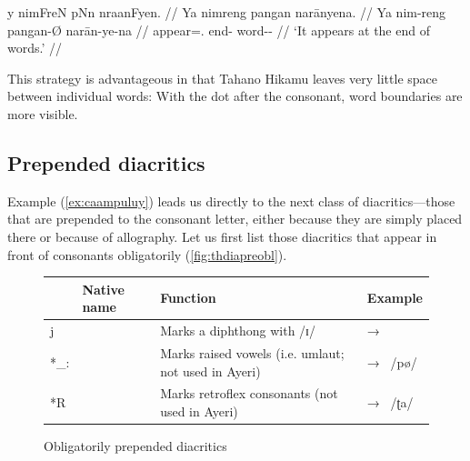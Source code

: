 \ex[everygla=\Tagati\Large,everyglb=\itshape]\begingl
	\gla y nimFreN\thafterdot{} pNn\thafterdot{} 
		nraanFyen. //
	\glb Ya nimreng pangan narānyena. //
	\glc Ya nim-reng pangan-Ø narān-ye-na //
	\glc \LocT{} appear=\TsgI{}.\Aarg{} end-\Top{} word-\Pl{}-\Gen{} //
	\glft `It appears at the end of words.' //
\endgl\xe

This strategy is advantageous in that Tahano Hikamu leaves very little space 
between individual words:  With the dot after the consonant, word boundaries are more visible.

\subsection{Prepended diacritics}

Example (\ref{ex:caampuluy}) leads us directly to the next class of 
diacritics---those that are prepended to the consonant letter, either because 
they are simply placed there or because of allography. Let us first list those 
diacritics that appear in front of consonants obligatorily 
(\autoref{fig:thdiapreobl}).

\begin{figure}[tp]
\caption{Obligatorily prepended diacritics}
\begin{tabu} to 
\toprule
\tableheaderfont

	& Native name
	& Function
	& Example
	\\
	
\toprule

*j
	& 
	& Marks a diphthong with /ɪ/
	&  → 
	\\
	
\midrule

*\_:
	& 
	& Marks raised vowels (i.e. umlaut; not used in Ayeri)
	&  → ~/pø/
	\\
	
\midrule

*R
	& 
	& Marks retroflex consonants (not used in Ayeri)\footnotemark
	&  → ~/ʈa/
	\\

\bottomrule
\end{tabu}
\label{fig:thdiapreobl}
\end{figure}

